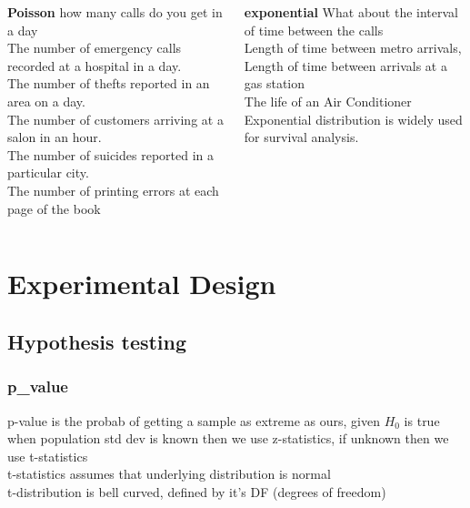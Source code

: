 \documentclass{beamer}
\begin{document}
\begin{frame}%
\begin{columns}
	\begin{column}{0.45\textwidth}
		\textbf{Poisson}
		how many calls do you get in a day
		\\ The number of emergency calls recorded at a hospital in a day.
		\\ The number of thefts reported in an area on a day.
		\\ The number of customers arriving at a salon in an hour.
		\\ The number of suicides reported in a particular city.
		\\ The number of printing errors at each page of the book
	\end{column}
	\begin{column}{0.45\textwidth}
		\textbf{exponential}
		What about the interval of time between the calls
		\\ Length of time between metro arrivals,
		\\ Length of time between arrivals at a gas station
		\\ The life of an Air Conditioner
		\\Exponential distribution is widely used for survival analysis. 
	\end{column}
\end{columns}
\end{frame}






\section{Experimental Design}

\subsection{Hypothesis testing}

\begin{frame}\frametitle{p\_value}
p-value is the probab of getting a sample as extreme as ours, given $H_0$ is true\\
when population std dev is known then we use z-statistics, if unknown then we use t-statistics\\
t-statistics assumes that underlying distribution is normal\\
t-distribution is bell curved, defined by it's DF (degrees of freedom)\\

\end{frame}
\end{document}
